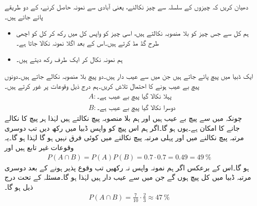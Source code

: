 دھیان کریں کہ  چیزوں کے سلسلہ سے چیز نکالنے، یعنی آبادی سے نمونہ حاصل کرنے، کے دو طریقے پائے جاتے ہیں۔
\begin{itemize}
\item {}
ہم کل سے جس چیز کو بلا منصوبہ نکالتے ہیں، اسی چیز کو واپس کل میں رکھ کر کل کو اچھی طرح  گڈ مڈ کرتے ہیں۔اس کے بعد اگلا نمونہ نکالا جاتا ہے۔
\item{}
ہم نمونہ نکال کر ایک طرف رکھ دیتے ہیں۔
\end{itemize}

\quad {}
ایک ڈبیا میں  پیچ پائے جاتے ہیں جن میں سے  عیب دار ہیں۔دو پیچ بلا منصوبہ نکالے جاتے ہیں۔دونوں پیچ بے عیب ہونے کا احتمال تلاش کریں۔ہم درج ذیل وقوعات پر غور کرتے ہیں۔
\begin{align*}
&A:\text{پہلا نکالا گیا پیچ بے عیب ہے۔}\\
&B:\text{دوسرا نکالا گیا پیچ بے عیب ہے۔}
\end{align*}
چونکہ  میں سے  پیچ بے  عیب ہیں اور ہم بلا منصوبہ پیچ نکالتے ہیں لہٰذا ہر پیچ کا نکالے جانے کا امکان  ہے۔یوں    ہو گا۔اگر ہم اس پیچ کو واپس ڈبیا میں رکھ دیں تب دوسری مرتبہ پیچ نکالنے میں اور پہلی مرتبہ پیچ نکالنے میں کوئی فرق نہیں ہو گا لہٰذا  ہو گا۔یہ وقوعات غیر تابع ہیں اور
\begin{align*}
P(A\cap B)=P(A)P(B)=0.7\cdot 0.7=0.49=\SI{49}{\percent}
\end{align*}
ہو گا۔اس کے برعکس اگر ہم نمونہ واپس نہ رکھیں تب  وقوع پذیر ہونے کے بعد دوسری مرتبہ ڈبیا میں کل  پیچ ہوں گے جن میں سے  عیب دار ہیں لہٰذا   ہو گا۔مسئلہ  کے تحت درج ذیل ہو گا۔
\begin{align*}
P(A\cap B)=\frac{7}{10}\cdot \frac{2}{3} \approx \SI{47}{\percent}
\end{align*}

